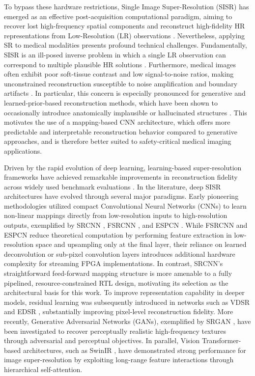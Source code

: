 \documentclass[conference]{IEEEtran}
\begin{document}
To bypass these hardware restrictions, Single Image Super-Resolution (SISR) has emerged as an effective post-acquisition computational paradigm, aiming to recover lost high-frequency spatial components and reconstruct high-fidelity HR representations from Low-Resolution (LR) observations \cite{yang2019deep, liu2025comprehensive}. Nevertheless, applying SR to medical modalities presents profound technical challenges. Fundamentally, SISR is an ill-posed inverse problem in which a single LR observation can correspond to multiple plausible HR solutions \cite{yang2019deep, liu2025comprehensive}. Furthermore, medical images often exhibit poor soft-tissue contrast and low signal-to-noise ratios, making unconstrained reconstruction susceptible to noise amplification and boundary artifacts \cite{obuchowicz2026image, varghese2024enhancing}. In particular, this concern is especially pronounced for generative and learned-prior-based reconstruction methods, which have been shown to occasionally introduce anatomically implausible or hallucinated structures \cite{bhadra2021hallucinations, giraldo2024perceptual}. This motivates the use of a mapping-based CNN architecture, which offers more predictable and interpretable reconstruction behavior compared to generative approaches, and is therefore better suited to safety-critical medical imaging applications.

Driven by the rapid evolution of deep learning, learning-based super-resolution frameworks have achieved remarkable improvements in reconstruction fidelity across widely used benchmark evaluations \cite{dong2014learning, kim2016accurate, lim2017enhanced}. In the literature, deep SISR architectures have evolved through several major paradigms. Early pioneering methodologies utilized compact Convolutional Neural Networks (CNNs) to learn non-linear mappings directly from low-resolution inputs to high-resolution outputs, exemplified by SRCNN \cite{dong2014learning}, FSRCNN \cite{dong2016accelerating}, and ESPCN \cite{shi2016real}. While FSRCNN \cite{dong2016accelerating} and ESPCN \cite{shi2016real} reduce theoretical computation by performing feature extraction in low-resolution space and upsampling only at the final layer, their reliance on learned deconvolution or sub-pixel convolution layers introduces additional hardware complexity for streaming FPGA implementations. In contrast, SRCNN's straightforward feed-forward mapping structure is more amenable to a fully pipelined, resource-constrained RTL design, motivating its selection as the architectural basis for this work. To improve representation capability in deeper models, residual learning was subsequently introduced in networks such as VDSR \cite{kim2016accurate} and EDSR \cite{lim2017enhanced}, substantially improving pixel-level reconstruction fidelity. More recently, Generative Adversarial Networks (GANs), exemplified by SRGAN \cite{ledig2017photo}, have been investigated to recover perceptually realistic high-frequency textures through adversarial and perceptual objectives. In parallel, Vision Transformer-based architectures, such as SwinIR \cite{liang2021swinir}, have demonstrated strong performance for image super-resolution by exploiting long-range feature interactions through hierarchical self-attention.
\end{document}

